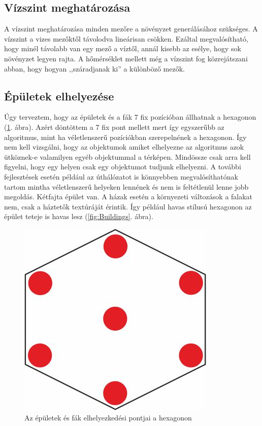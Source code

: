\subsection{Vízszint meghatározása}

A vízszint meghatározása minden mezőre a növényzet generálásához szükséges. A vízszint a vizes mezőktől távolodva lineárisan csökken. Ezáltal megvalósítható, hogy minél távolabb van egy mező a víztől, annál kisebb az esélye, hogy sok növényzet legyen rajta. A hőmérséklet mellett még a vízszint fog közrejátszani abban, hogy hogyan ,,száradjanak ki'' a különböző mezők.

\subsection{Épületek elhelyezése}

Úgy terveztem, hogy az épületek és a fák 7 fix pozícióban állhatnak a hexagonon (\ref{fig:Places}. ábra). Azért döntöttem a 7 fix pont mellett mert így egyszerűbb az algoritmus, mint ha véletlenszerű pozíciókban szerepelnének a hexagonon. Így nem kell vizsgálni, hogy az objektumok amiket elhelyezne az algoritmus azok ütköznek-e valamilyen egyéb objektummal a térképen. Mindössze csak arra kell figyelni, hogy egy helyen csak egy objektumot tudjunk elhelyezni. A további fejlesztések esetén például az úthálózatot is könnyebben megvalósíthatónak tartom mintha véletlenszerű helyeken lennének és nem is feltétlenül lenne jobb megoldás. Kétfajta épület van. A házak esetén a környezeti változások a falakat nem, csak a háztetők textúráját érintik. Így például havas stílusú hexagonon az épület teteje is havas lesz (\ref{fig:Buildings}. ábra).

\begin{figure}[h!]
\centering
\includegraphics[scale=1]{kepek/Places.jpg}
\caption{Az épületek és fák elhelyezkedési pontjai a hexagonon}
\label{fig:Places}
\end{figure}

